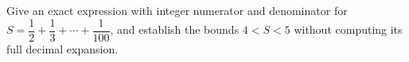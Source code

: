 Give an exact expression with integer numerator and denominator for $S=\dfrac{1}{2}+\dfrac{1}{3}+\cdots+\dfrac{1}{100}$, and establish the bounds $4<S<5$ without computing its full decimal expansion.
